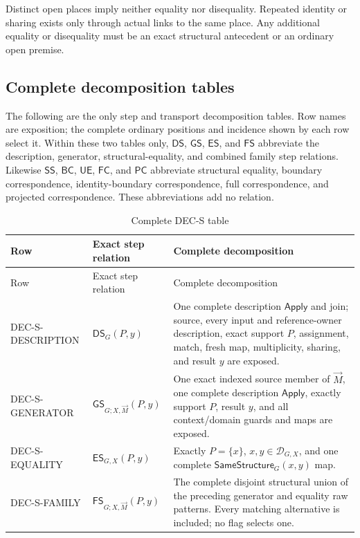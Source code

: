 \documentclass[11pt,twoside]{article}
\newcommand{\Apply}{\mathsf{Apply}}
\newcommand{\SameStructure}{\mathsf{SameStructure}}
\begin{document}
Distinct open places imply neither equality nor disequality.  Repeated identity or
sharing exists only through actual links to the same place.  Any additional
equality or disequality must be an exact structural antecedent or an ordinary open
premise.

\subsection{Complete decomposition tables}

The following are the only step and transport decomposition tables.  Row names are
exposition; the complete ordinary positions and incidence shown by each row select
it.  Within these two tables only, \(\mathsf{DS}\), \(\mathsf{GS}\),
\(\mathsf{ES}\), and \(\mathsf{FS}\) abbreviate the description, generator,
structural-equality, and combined family step relations.  Likewise
\(\mathsf{SS}\), \(\mathsf{BC}\), \(\mathsf{UE}\), \(\mathsf{FC}\), and
\(\mathsf{PC}\) abbreviate structural equality, boundary correspondence,
identity-boundary correspondence, full correspondence, and projected
correspondence.  These abbreviations add no relation.

\begin{longtable}{>{\raggedright\arraybackslash}p{}
                  >{\raggedright\arraybackslash}p{}
                  >{\raggedright\arraybackslash}p{}}
\caption{Complete DEC-S table}\label{tab:decs}\\
\toprule
Row & Exact step relation & Complete decomposition\\
\midrule
\endfirsthead%
\toprule
Row & Exact step relation & Complete decomposition\\
\midrule
\endhead%
DEC-S-DESCRIPTION &
\(\mathsf{DS}_G(P,y)\) &
One complete description \(\Apply\) and join; source, every input and
reference-owner description, exact support \(P\), assignment, match, fresh map,
multiplicity, sharing, and result \(y\) are exposed.\\
DEC-S-GENERATOR &
\(\mathsf{GS}_{G;X,\vec M}(P,y)\) &
One exact indexed source member of \(\vec M\), one complete description
\(\Apply\), exactly support \(P\), result \(y\), and all context/domain guards and
maps are exposed.\\
DEC-S-EQUALITY &
\(\mathsf{ES}_{G,X}(P,y)\) &
Exactly \(P=\{x\}\), \(x,y\in\mathcal D_{G,X}\), and one complete
\(\SameStructure_G(x,y)\) map.\\
DEC-S-FAMILY &
\(\mathsf{FS}_{G;X,\vec M}(P,y)\) &
The complete disjoint structural union of the preceding generator and equality
raw patterns.  Every matching alternative is included; no flag selects one.\\
\bottomrule
\end{longtable}
\end{document}
